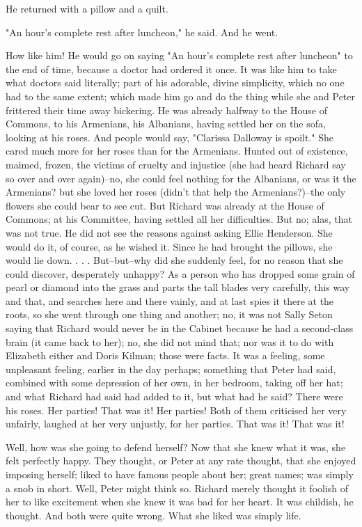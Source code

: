 \documentclass[lang=cn,10pt]{elegantbook}
\begin{document}
He returned with a pillow and a quilt.

"An hour's complete rest after luncheon," he said.  And he went.

How like him!  He would go on saying "An hour's complete rest after
luncheon" to the end of time, because a doctor had ordered it once.
It was like him to take what doctors said literally; part of his
adorable, divine simplicity, which no one had to the same extent;
which made him go and do the thing while she and Peter frittered
their time away bickering.  He was already halfway to the House of
Commons, to his Armenians, his Albanians, having settled her on the
sofa, looking at his roses.  And people would say, "Clarissa
Dalloway is spoilt."  She cared much more for her roses than for
the Armenians.  Hunted out of existence, maimed, frozen, the
victims of cruelty and injustice (she had heard Richard say so over
and over again)--no, she could feel nothing for the Albanians, or
was it the Armenians? but she loved her roses (didn't that help the
Armenians?)--the only flowers she could bear to see cut.  But
Richard was already at the House of Commons; at his Committee,
having settled all her difficulties.  But no; alas, that was not
true.  He did not see the reasons against asking Ellie Henderson.
She would do it, of course, as he wished it.  Since he had brought
the pillows, she would lie down. . . .  But--but--why did she
suddenly feel, for no reason that she could discover, desperately
unhappy?  As a person who has dropped some grain of pearl or
diamond into the grass and parts the tall blades very carefully,
this way and that, and searches here and there vainly, and at last
spies it there at the roots, so she went through one thing and
another; no, it was not Sally Seton saying that Richard would never
be in the Cabinet because he had a second-class brain (it came back
to her); no, she did not mind that; nor was it to do with Elizabeth
either and Doris Kilman; those were facts.  It was a feeling, some
unpleasant feeling, earlier in the day perhaps; something that
Peter had said, combined with some depression of her own, in her
bedroom, taking off her hat; and what Richard had said had added to
it, but what had he said?  There were his roses.  Her parties!
That was it!  Her parties!  Both of them criticised her very
unfairly, laughed at her very unjustly, for her parties.  That was
it!  That was it!

Well, how was she going to defend herself?  Now that she knew what
it was, she felt perfectly happy.  They thought, or Peter at any
rate thought, that she enjoyed imposing herself; liked to have
famous people about her; great names; was simply a snob in short.
Well, Peter might think so.  Richard merely thought it foolish of
her to like excitement when she knew it was bad for her heart.  It
was childish, he thought.  And both were quite wrong.  What she
liked was simply life.
\end{document}
